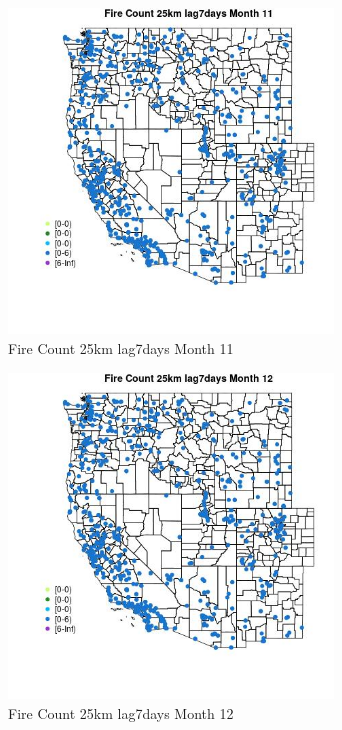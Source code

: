 \begin{figure} 
\centering  
\includegraphics[width=0.77\textwidth]{Code_Outputs/Report_ML_input_PM25_Step4_part_e_de_duplicated_aves_compiled_2019-05-21wNAs_MapObsMo11Fire_Count_25km_lag7days.jpg} 
\caption{\label{fig:Report_ML_input_PM25_Step4_part_e_de_duplicated_aves_compiled_2019-05-21wNAsMapObsMo11Fire_Count_25km_lag7days}Fire Count 25km lag7days Month 11} 
\end{figure} 
 

\clearpage 

\begin{figure} 
\centering  
\includegraphics[width=0.77\textwidth]{Code_Outputs/Report_ML_input_PM25_Step4_part_e_de_duplicated_aves_compiled_2019-05-21wNAs_MapObsMo12Fire_Count_25km_lag7days.jpg} 
\caption{\label{fig:Report_ML_input_PM25_Step4_part_e_de_duplicated_aves_compiled_2019-05-21wNAsMapObsMo12Fire_Count_25km_lag7days}Fire Count 25km lag7days Month 12} 
\end{figure} 
 

